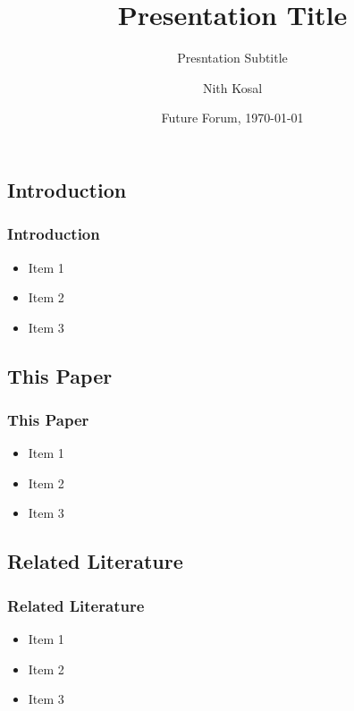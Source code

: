 \documentclass[11pt]{beamer}
\begin{document}
	\author[Nith Kosal]{Nith Kosal}
	\title[Presentation Title]{Presentation Title}
	\subtitle{Presntation Subtitle}
	\date[\today]{Future Forum, \today}
	\begin{frame}[plain]
		\maketitle
	\end{frame}
	
	\begin{frame}
		\section{Introduction}
		\frametitle{Introduction}
		
		\begin{itemize}
			\item Item 1
			\item Item 2
			\item Item 3
		\end{itemize}
	\end{frame}
	
	\begin{frame}
		\section{This Paper}
		\frametitle{This Paper}
		
		\begin{itemize}
			\item Item 1
			\item Item 2
			\item Item 3
		\end{itemize}
	\end{frame}

\begin{frame}
	\section{Related Literature}
	\frametitle{Related Literature}
	
	\begin{itemize}
		\item Item 1
		\item Item 2
		\item Item 3
	\end{itemize}
\end{frame}
\end{document}
